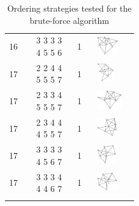 \begin{footnotesize}
\begin{longtable}{m{0.07\linewidth} m{0.15\linewidth} m{0.05\linewidth} m{0.15\linewidth}}
16 & 3 3 3 3 4 5 5 6 & 1 & \includegraphics[height=0.8cm]{15-universal-graphs/img/degree-sequences-example-graphs/graph-4-8-151}\\
17 & 2 2 4 4 5 5 5 7 & 1 & \includegraphics[height=0.8cm]{15-universal-graphs/img/degree-sequences-example-graphs/graph-4-8-152}\\
17 & 2 3 3 4 5 5 5 7 & 1 & \includegraphics[height=0.8cm]{15-universal-graphs/img/degree-sequences-example-graphs/graph-4-8-153}\\
17 & 2 3 4 4 4 5 5 7 & 1 & \includegraphics[height=0.8cm]{15-universal-graphs/img/degree-sequences-example-graphs/graph-4-8-154}\\
17 & 3 3 3 3 4 5 6 7 & 1 & \includegraphics[height=0.8cm]{15-universal-graphs/img/degree-sequences-example-graphs/graph-4-8-155}\\
17 & 3 3 3 4 4 4 6 7 & 1 & \includegraphics[height=0.8cm]{15-universal-graphs/img/degree-sequences-example-graphs/graph-4-8-156}\\
\bottomrule
\caption{Ordering strategies tested for the brute-force algorithm}
\label{tab:TODO}
\end{longtable}
\end{footnotesize}

